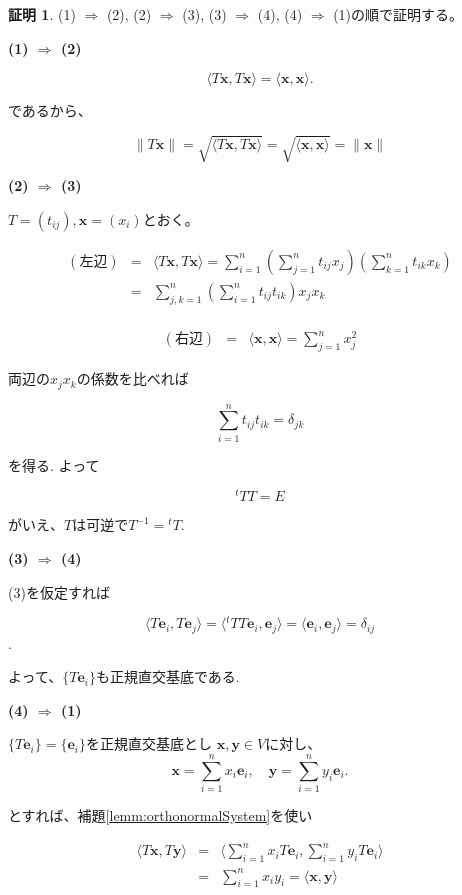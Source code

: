 \documentclass[dvipdfmx,autodetect-engine]{jsarticle}
\theoremstyle{definition}
\newtheorem*{Proof*}{証明}
\newcommand{\innerProduct}[2]{\langle \bm{#1}, \bm{#2} \rangle}
\newcommand{\transposeMat}[1]{{}^t\!{#1}}
\begin{document}
\begin{Proof*}
(1) $\Rightarrow$ (2), (2) $\Rightarrow$ (3), (3) $\Rightarrow$ (4), (4) $\Rightarrow$ (1)の順で証明する。

{\bf (1) $\Rightarrow$ (2)}

$$
\langle T\bm{x}, T\bm{x} \rangle = \langle \bm{x}, \bm{x} \rangle.
$$

であるから、

$$
\|T\bm{x}\| = \sqrt{\langle T\bm{x}, T\bm{x} \rangle} = \sqrt{\langle \bm{x}, \bm{x} \rangle} =\|\bm{x}\|
$$

{\bf (2) $\Rightarrow$ (3)}

$T = (t_{ij}), \bm{x} = (x_i)$とおく。


\begin{eqnarray*}
(左辺) &=& \langle T\bm{x}, T\bm{x} \rangle = \sum_{i=1}^n \left(\sum_{j=1}^n t_{ij}x_j\right) \left(\sum_{k=1}^n t_{ik}x_k\right) \\
&=& \sum_{j,k=1}^n \left(\sum_{i=1}^n t_{ij}t_{ik}\right)x_jx_k \\
\end{eqnarray*}

\begin{eqnarray*}
(右辺) &=& \langle \bm{x}, \bm{x} \rangle = \sum_{j=1}^n x_j^2
\end{eqnarray*}

両辺の$x_jx_k$の係数を比べれば

$$
\sum_{i=1}^n t_{ij}t_{ik} = \delta_{jk}
$$

を得る. よって

$$
\transposeMat{T}T = E
$$

がいえ、$T$は可逆で$T^{-1} = \transposeMat{T}$.

{\bf (3) $\Rightarrow$ (4)}

(3)を仮定すれば

$$
\langle T\bm{e}_i, T\bm{e}_j \rangle = \langle \transposeMat{T}T\bm{e}_i, \bm{e}_j \rangle = \langle \bm{e}_i, \bm{e}_j \rangle = \delta_{ij}
$$.

よって、$\{T\bm{e}_i\}$も正規直交基底である.

{\bf (4) $\Rightarrow$ (1)}

$\{T\bm{e}_i\} = \{\bm{e}_i\}$を正規直交基底とし $\bm{x}, \bm{y} \in V$に対し、
$$
\bm{x} = \sum_{i=1}^n x_i\bm{e}_i, \quad \bm{y} = \sum_{i=1}^n y_i\bm{e}_i.
$$

とすれば、補題\ref{lemm:orthonormalSystem}を使い

\begin{eqnarray*}
\langle T\bm{x}, T\bm{y} \rangle &=& \langle \sum_{i=1}^n x_iT\bm{e}_i, \sum_{i=1}^n y_iT\bm{e}_i \rangle \\
&=& \sum_{i=1}^n x_iy_i = \innerProduct{x}{y}
\end{eqnarray*}
\end{Proof*}
\end{document}

